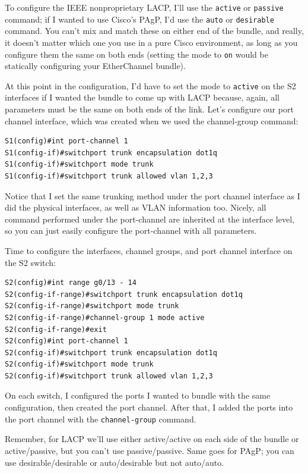 To configure the IEEE nonproprietary LACP, I'll use the \texttt{active}
or \texttt{passive} command; if I wanted to use Cisco's PAgP, I'd use
the \texttt{auto} or \texttt{desirable} command. You can't mix and match
these on either end of the bundle, and really, it doesn't matter which
one you use in a pure Cisco environment, as long as you configure them
the same on both ends (setting the mode to \texttt{on} would be
statically configuring your EtherChannel bundle).

At this point in the configuration, I'd have to set the mode to
\texttt{active} on the S2 interfaces if I wanted the bundle to come up
with LACP because, again, all parameters must be the same on both ends
of the link. Let's configure our port channel interface, which was
created when we used the channel-group command:

\begin{verbatim}
S1(config)#int port-channel 1
S1(config-if)#switchport trunk encapsulation dot1q
S1(config-if)#switchport mode trunk
S1(config-if)#switchport trunk allowed vlan 1,2,3
\end{verbatim}

Notice that I set the same trunking method under the port channel
interface as I did the physical interfaces, as well as VLAN information
too. Nicely, all command performed under the port-channel are inherited
at the interface level, so you can just easily configure the
port-channel with all parameters.

Time to configure the interfaces, channel groups, and port channel interface on the S2 switch:

\begin{verbatim}
S2(config)#int range g0/13 - 14
S2(config-if-range)#switchport trunk encapsulation dot1q
S2(config-if-range)#switchport mode trunk
S2(config-if-range)#channel-group 1 mode active
S2(config-if-range)#exit
S2(config)#int port-channel 1
S2(config-if)#switchport trunk encapsulation dot1q
S2(config-if)#switchport mode trunk
S2(config-if)#switchport trunk allowed vlan 1,2,3
\end{verbatim}

On each switch, I configured the ports I wanted to bundle with the same
configuration, then created the port channel. After that, I added the
ports into the port channel with the \texttt{channel-group} command.

Remember, for LACP we'll use either active/active on each side of the
bundle or active/passive, but you can't use passive/passive. Same goes
for PAgP; you can use desirable/desirable or auto/desirable but not
auto/auto.

